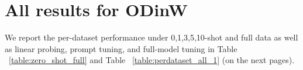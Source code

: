 \documentclass{article}
\begin{document}
\begin{table}[ht!]
\caption{Model inference speed on various tasks. We report FPS, which is the number of images processed per second per GPU (higher is better).}
\label{table:inference_speed}
\begin{center}
\end{center}
\end{table}

\section{All results for ODinW}
\label{sec:all_results}

We report the per-dataset performance under 0,1,3,5,10-shot and full data as well as linear probing, prompt tuning, and full-model tuning in Table ~\ref{table:zero_shot_full} and Table ~\ref{table:perdataset_all_1} (on the next pages).
\end{document}
